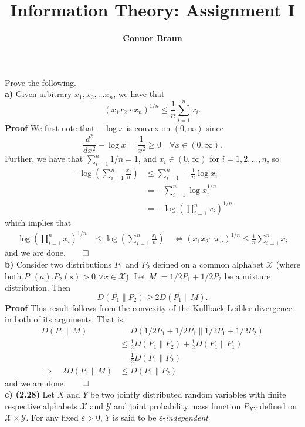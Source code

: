 \documentclass[11pt, letterpaper]{article}
\title{\bf Information Theory: Assignment I}
\author{\bf Connor Braun}
\date{}
\newcommand{\mc}[1]{\mathcal{#1}}
\begin{document}
\maketitle
{} Prove the following.\\[10pt]
{\bf a)} Given arbitrary $x_1,x_2,\dots x_n$, we have that
\[(x_1x_2\cdots x_n)^{1/n}\leq\frac{1}{n}\sum_{i=1}^nx_i.\]
{\bf Proof} We first note that $-\log x$ is convex on $(0,\infty)$ since
\[\frac{d^2}{dx^2}-\log x=\frac{1}{x^2}\geq 0\quad\forall x\in(0,\infty).\]
Further, we have that $\sum_{i=1}^n1/n=1$, and $x_i\in(0,\infty)$ for $i=1,2,\dots,n$, so
\begin{align*}
    -\log\left(\sum_{i=1}^n\frac{x_i}{n}\right)&\leq \sum_{i=1}^n-\frac{1}{n}\log x_i\tag{by convexity of $-\log x$ on $(0,\infty)$}\\
    &=-\sum_{i=1}^n\log x_i^{1/n}\\
    &=-\log\left(\prod_{i=1}^nx_i\right)^{1/n}
\end{align*}
which implies that
\begin{align*}
    \log\left(\prod_{i=1}^nx_i\right)^{1/n}&\leq\log\left(\sum_{i=1}^n\frac{x_i}{n}\right)\quad\Leftrightarrow (x_1x_2\cdots x_n)^{1/n}\leq\frac{1}{n}\sum_{i=1}^nx_i\tag{since $\log$ is monotonic increasing}
\end{align*}
and we are done.\hfill{$\qed$}\\[10pt]
{\bf b)} Consider two distributions $P_1$ and $P_2$ defined on a common alphabet $\mc{X}$ (where both $P_1(a)$,$P_2(s)>0$ $\forall x\in\mc{X}$).
Let $M:=1/2P_1+1/2P_2$ be a mixture distribution. Then
\[D(P_1\|P_2)\geq 2D(P_1\|M).\]
{\bf Proof} This result follows from the convexity of the Kullback-Leibler divergence in both of its arguments. That is,
\begin{align*}
    D(P_1\|M)&=D(1/2P_1+1/2P_1\|1/2P_1+1/2P_2)\\
    &\leq \frac{1}{2}D(P_1\|P_2)+\frac{1}{2}D(P_1\|P_1)\\
    &=\frac{1}{2}D(P_1\|P_2)\tag{since $D(P_1\|P_1)=0$}\\
    \Rightarrow\quad 2D(P_1\|M)&\leq D(P_1\|P_2)
\end{align*}
and we are done.\hfill{$\qed$}\\[10pt]
{\bf c) (2.28)} Let $X$ and $Y$ be two jointly distributed random variables with finite respective alphabets $\mc{X}$ and $\mc{Y}$ and
joint probability mass function $P_{XY}$ defined on $\mc{X}\times\mc{Y}$. For any fixed $\varepsilon>0$, $Y$ is said to be $\varepsilon$-{\it independent}
\end{document}
